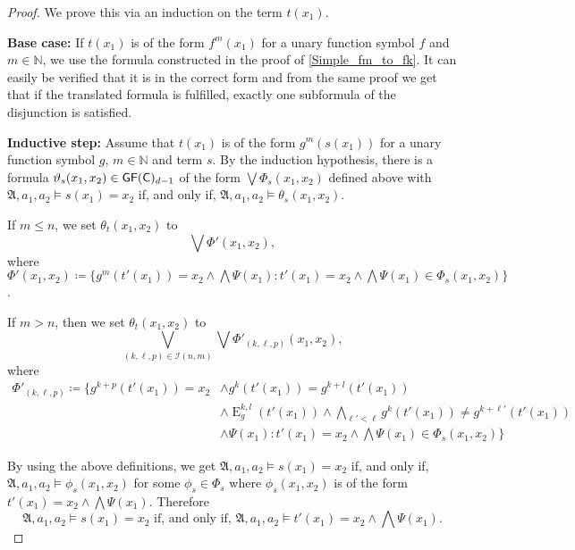 \begin{proof}
	We prove this via an induction on the term $t(x_1)$.
	
	\textbf{Base case:}
	If $t(x_1)$ is of the form $f^{m}(x_1)$ for a unary function symbol $f$ and $m\in \mathbb N$, we use the formula constructed in the proof of \cref{Simple_fm_to_fk}.
	It can easily be verified that it is in the correct form and from the same proof we get that if the translated formula is fulfilled, exactly one subformula of the disjunction is satisfied.
	
	\textbf{Inductive step:}
	Assume that $t(x_1)$ is of the form $g^m(s(x_1))$ for a unary function symbol $g$, $m\in\mathbb N$ and term $s$.
	By the induction hypothesis, there is a formula $\vartheta_{s}(x_1,x_2)\in \mathsf{GF}(\mathsf{C})_{d-1}$ of the form $\bigvee \Phi_s(x_1,x_2)$ defined above with $\mathfrak A,a_1,a_2 \models s(x_1)=x_2$ if, and only if, $\mathfrak A,a_1,a_2\models \theta_{s}(x_1,x_2)$.
	
	If $m\leq n$, we set $\theta_{t}(x_1,x_2)$ to
	$$\bigvee \Phi'(x_1,x_2),$$
	where $\Phi'(x_1,x_2)\coloneqq\{g^{m}(t'(x_1))=x_2 \land \bigwedge \Psi(x_1) : t'(x_1)=x_2 \land \bigwedge \Psi(x_1)\in \Phi_s(x_1,x_2)\}$.
	
	If $m>n$, then we set $\theta_{t}(x_1,x_2)$ to
	$$\bigvee_{(k,\ell,p)\in \mathcal I(n,m)} \bigvee \Phi'_{(k,\ell,p)}(x_1,x_2),$$
	where 
	\begin{align*}
		\Phi'_{(k,\ell,p)}\coloneqq \{g^{k+p}(t'(x_1))=x_2 &\land g^{k}(t'(x_1))=g^{k+l}(t'(x_1)) \\
		& \land \operatorname{E}^{k,l}_g(t'(x_1)) \land \bigwedge_{\ell'<\ell} g^{k}(t'(x_1))\neq g^{k+\ell'}(t'(x_1)) \\
		& \land \Psi(x_1) : t'(x_1)=x_2 \land \bigwedge \Psi(x_1)\in \Phi_s(x_1,x_2)\}
	\end{align*}
	
	By using the above definitions, we get $\mathfrak A,a_1,a_2\models s(x_1)=x_2$ if, and only if, $\mathfrak A,a_1,a_2\models \phi_s(x_1,x_2)$ for some $\phi_s\in\Phi_s$ where $\phi_s(x_1,x_2)$ is of the form $t'(x_1)=x_2 \land \bigwedge \Psi(x_1)$.
	Therefore
	\begin{equation*}
		\mathfrak A, a_1,a_2 \models s(x_1)=x_2 \text{ if, and only if, } \mathfrak A,a_1,a_2 \models t'(x_1)=x_2 \land \bigwedge \Psi(x_1).
		\tag{$\star$}
		\label{eq:a}
	\end{equation*}
	

\end{proof}
